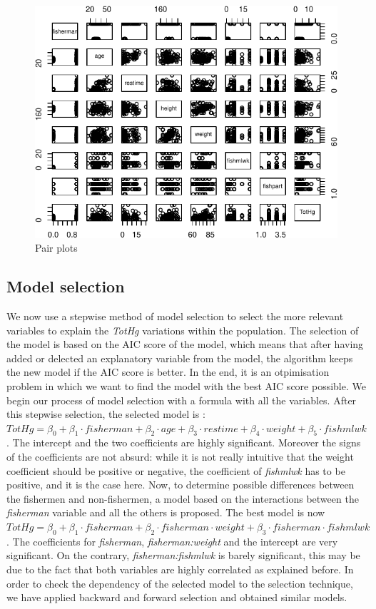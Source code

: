 \documentclass[12pt,]{article}
\begin{document}
\begin{figure}
\centering
\includegraphics{Report_files/figure-latex/unnamed-chunk-8-1.pdf}
\caption{\label{fig:pair_plots}Pair plots}
\end{figure}

\subsection{Model selection}\label{model-selection}

We now use a stepwise method of model selection to select the more
relevant variables to explain the \emph{TotHg} variations within the
population. The selection of the model is based on the AIC score of the
model, which means that after having added or delected an explanatory
variable from the model, the algorithm keeps the new model if the AIC
score is better. In the end, it is an otpimisation problem in which we
want to find the model with the best AIC score possible. We begin our
process of model selection with a formula with all the variables. After
this stepwise selection, the selected model is :
\(TotHg = \beta_0 + \beta_1 \cdot fisherman + \beta_2 \cdot age + \beta_3 \cdot restime + \beta_4 \cdot weight + \beta_5 \cdot fishmlwk\).
The intercept and the two coefficients are highly significant. Moreover
the signs of the coefficients are not absurd: while it is not really
intuitive that the weight coefficient should be positive or negative,
the coefficient of \emph{fishmlwk} has to be positive, and it is the
case here. Now, to determine possible differences between the fishermen
and non-fishermen, a model based on the interactions between the
\emph{fisherman} variable and all the others is proposed. The best model
is now
\(TotHg = \beta_0 + \beta_1 \cdot fisherman + \beta_2 \cdot fisherman \cdot weight + \beta_3 \cdot fisherman \cdot fishmlwk\).
The coefficients for \emph{fisherman}, \emph{fisherman:weight} and the
intercept are very significant. On the contrary,
\emph{fisherman:fishmlwk} is barely significant, this may be due to the
fact that both variables are highly correlated as explained before. In
order to check the dependency of the selected model to the selection
technique, we have applied backward and forward selection and obtained
similar models.
\end{document}

